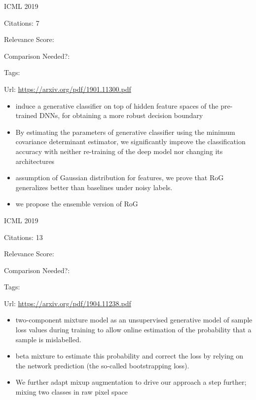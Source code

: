 \documentclass[11pt]{article}
\begin{document}
\vspace{2cm}

\noindent ICML 2019

\noindent Citations: 7

\noindent Relevance Score:

\noindent Comparison Needed?: 

\noindent Tags:

\noindent Url: \url{https://arxiv.org/pdf/1901.11300.pdf}

\begin{itemize}
  \item induce a generative classifier on top of hidden feature spaces of the pre-trained DNNs, for obtaining a more robust decision boundary
  \item By estimating the parameters of generative classifier using the minimum covariance determinant estimator, we significantly improve the classification accuracy with neither re-training of the deep model nor changing its architectures
  \item assumption of Gaussian distribution for features, we prove that RoG generalizes better than baselines under noisy labels.
  \item we propose the ensemble version of RoG
\end{itemize}


\vspace{2cm}

\noindent ICML 2019

\noindent Citations: 13

\noindent Relevance Score:

\noindent Comparison Needed?: 

\noindent Tags:

\noindent Url: \url{https://arxiv.org/pdf/1904.11238.pdf}

\begin{itemize}
  \item two-component mixture model as an unsupervised generative model of sample loss values during training to allow online estimation of the probability that a sample is mislabelled. 
  \item beta mixture to estimate this probability and correct the loss by relying on the network prediction (the so-called bootstrapping loss).
  \item We further adapt mixup augmentation to drive our approach a step further; mixing two classes in raw pixel space
\end{itemize}
\end{document}
